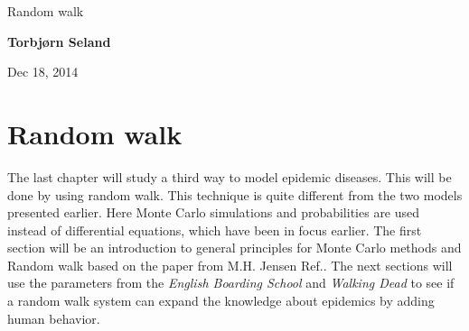 \documentclass[%
twoside,                 %
final,                   %
chapterprefix=true,      %
open=right               %
10pt]{book}
\begin{document}





\thispagestyle{empty}

\begin{center}
{\LARGE\bf
\begin{spacing}{1.25}
Random walk
\end{spacing}
}
\end{center}


\begin{center}
{\bf Torbjørn Seland${}^{}$} \\ [0mm]
\end{center}

    \begin{center}
\end{center}


\begin{center}
Dec 18, 2014
\end{center}

\vspace{1cm}


\tableofcontents


\vspace{1cm} %





\newcommand{\Imax}{I_{\textrm{max}}}

\chapter{Random walk}
The last chapter will study a third way to model epidemic diseases. This will be done by using random walk. This technique is quite different from the two models presented earlier. Here Monte Carlo simulations and probabilities are used instead of differential equations, which have been in focus earlier. The first section will be an introduction to general principles for Monte Carlo methods and Random walk based on the paper from M.H. Jensen Ref.\cite{hjorth2011computational}. The next sections will use the parameters from the \emph{English Boarding School} and \emph{Walking Dead} to see if a random walk system can expand the knowledge about epidemics by adding human behavior. 
\end{document}
